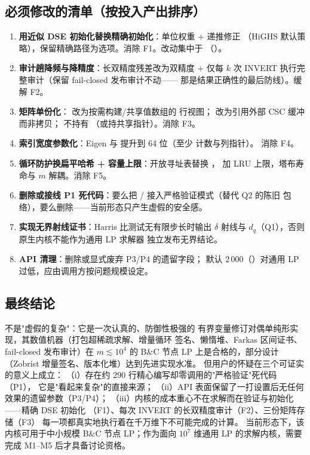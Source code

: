 \documentclass[11pt]{ctexart}
\begin{document}
\subsection{必须修改的清单（按投入产出排序）}
\begin{enumerate}[label=M\arabic*.,leftmargin=3em]
\item \textbf{用近似 DSE 初始化替换精确初始化}：单位权重 + 递推修正
（HiGHS 默认策略），保留精确路径为选项。消除 F1。改动集中于
（）。
\item \textbf{审计趟降频与降精度}：长双精度残差改为双精度 + 仅每
$k$ 次 INVERT 执行完整审计（保留 fail-closed 发布审计不动——
那是结果正确性的最后防线）。缓解 F2。
\item \textbf{矩阵单份化}： 改为按需构建/共享值数组的
行视图； 改为引用外部 CSC 缓冲而非拷贝；
 不持有 （或持共享指针）。消除 F3。
\item \textbf{索引宽度参数化}：Eigen  与
 提升到 64 位（至少  计数与列指针）。
消除 F4。
\item \textbf{循环防护换扁平哈希 + 容量上限}：开放寻址表替换
， 加 LRU 上限，塔布寿命与
$m$ 解耦。消除 F5。
\item \textbf{删除或接线 P1 死代码}：要么把 /
 接入严格验证模式（替代 Q2 的陈旧
包络），要么删除——当前形态只产生虚假的安全感。
\item \textbf{实现无界射线证书}：Harris 比测试无有限步长时输出
$\delta$ 射线与 $d_q$（Q1），否则原生内核不能作为通用 LP 求解器
独立发布无界结论。
\item \textbf{API 清理}：删除或显式废弃 P3/P4 的遗留字段；
 默认 2\,000（）对通用
LP 过低，应由调用方按问题规模设定。
\end{enumerate}

\subsection{最终结论}
 不是"虚假的复杂"：它是一次认真的、防御性极强的
有界变量修订对偶单纯形实现，其数值机器（打包超稀疏求解、增量循环
签名、懒惰堆、Farkas 区间证书、fail-closed 发布审计）在
$m\lesssim 10^{4}$ 的 B\&C 节点 LP 上是合格的，部分设计
（Zobrist 增量签名、版本化堆）达到先进实现水准。
但用户的怀疑在三个可证实的意义上成立：
（i）存在约 290 行精心编写却零调用的"严格验证"死代码（P1），
它是"看起来复杂"的直接来源；
（ii）API 表面保留了一打设置后无任何效果的遗留参数（P3/P4）；
（iii）内核的成本重心不在求解而在验证与初始化——精确 DSE 初始化
（F1）、每次 INVERT 的长双精度审计（F2）、三份矩阵存储（F3）
每一项都真实地执行着在千万维下不可能完成的计算。
当前形态下，该内核可用于中小规模 B\&C 节点 LP；作为面向
$10^{7}$ 维通用 LP 的求解内核，需要完成 M1--M5 后才具备讨论资格。
\end{document}
